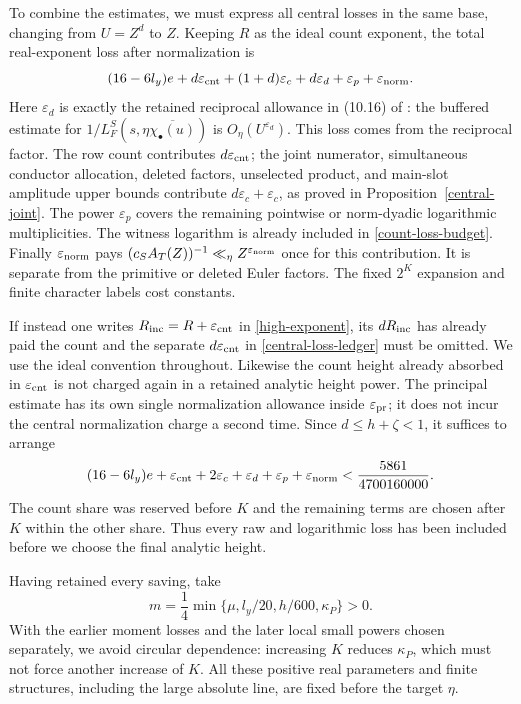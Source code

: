 \documentclass[10pt,reqno,a4paper]{amsart}
\theoremstyle{remark}
\newcommand{\eps}{\varepsilon}
\begin{document}
To combine the estimates, we must express all central losses in the
same base, changing from $U=Z^d$ to $Z$. Keeping $R$ as the ideal
count exponent, the total real-exponent loss after normalization is
\begin{equation}\label{central-loss-ledger}
 (16-6l_y)e+d\eps_{\rm cnt}+(1+d)\eps_c
                  +d\eps_d+\eps_p+\eps_{\rm norm}.
\end{equation}
Here $\eps_d$ is exactly the retained reciprocal allowance in
(10.16) of \cite{q30}: the buffered estimate for
$1/L_F^S(s,\eta\overline{\chi_\bullet(u)})$ is $O_\eta(U^{\eps_d})$.
This loss comes from the reciprocal factor. The row count contributes $d\eps_{\rm cnt}$;
the joint numerator, simultaneous conductor allocation, deleted
factors, unselected product, and main-slot amplitude upper bounds
contribute $d\eps_c+\eps_c$, as proved in
Proposition~\ref{central-joint}. The power $\eps_p$ covers the remaining pointwise or norm-dyadic
logarithmic multiplicities. The witness logarithm is already included in \eqref{count-loss-budget}.
Finally $\eps_{\rm norm}$ pays $(c_SA_T(Z))^{-1}\ll_\eta
Z^{\eps_{\rm norm}}$ once for this contribution. It is separate
from the primitive or deleted Euler factors. The fixed $2^K$
expansion and finite character labels cost constants.

If instead one writes $R_{\rm inc}=R+\eps_{\rm cnt}$ in
\eqref{high-exponent}, its $dR_{\rm inc}$ has already paid the
count and the separate $d\eps_{\rm cnt}$ in
\eqref{central-loss-ledger} must be omitted. We use the ideal
convention throughout. Likewise the count height already absorbed
in $\eps_{\rm cnt}$ is not charged again in a retained analytic
height power. The principal estimate has its own single normalization
allowance inside $\eps_{\rm pr}$; it does not incur the central
normalization charge a second time.
Since $d\le h+\zeta<1$, it suffices to arrange
\[
 (16-6l_y)e+\eps_{\rm cnt}+2\eps_c+\eps_d+
       \eps_p+\eps_{\rm norm}<\frac{5861}{4700160000}.
\]
The count share was reserved before $K$ and the remaining terms are
chosen after $K$ within the other share. Thus every raw and logarithmic loss has been included before we
choose the final analytic height.

Having retained every saving, take
\[
             m=\frac14\min\{\mu,l_y/20,h/600,\kappa_P\}>0.
\]
With the earlier moment losses and the later local small powers
chosen separately, we avoid circular dependence: increasing $K$ reduces
$\kappa_P$, which must not force another increase of $K$. All these
positive real parameters and finite structures, including the
large absolute line, are fixed before the target $\eta$.
\end{document}
